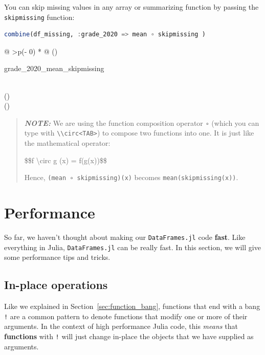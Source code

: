 \documentclass[
  notoc %
]{tufte-book}
\newcommand{\passthrough}[1]{#1}
\begin{document}
You can skip missing values in any array or summarizing function by
passing the \passthrough{\lstinline!skipmissing!} function:

\begin{lstlisting}[language=Julia]
combine(df_missing, :grade_2020 => mean ∘ skipmissing )
\end{lstlisting}

\begin{longtable}[]{@{}
  >{\raggedleft\arraybackslash}p{(\columnwidth - 0\tabcolsep) * }@{}}
\toprule()
\begin{minipage}[b]{\linewidth}\raggedleft
grade\_2020\_mean\_skipmissing
\end{minipage} \\
\midrule()
 \\
\bottomrule()
\end{longtable}

\begin{quote}
\textbf{\emph{NOTE:}} We are using the function composition operator
\passthrough{\lstinline!∘!} (which you can type with
\passthrough{\lstinline!\\circ<TAB>!}) to compose two functions into
one. It is just like the mathematical operator:

\$\$f \textbackslash circ g (x) = f(g(x))\$\$

Hence, \passthrough{\lstinline!(mean ∘ skipmissing)(x)!} becomes
\passthrough{\lstinline!mean(skipmissing(x))!}.
\end{quote}

\hypertarget{sec:df_performance}{%
\section{Performance}\label{sec:df_performance}}

So far, we haven't thought about making our
\passthrough{\lstinline!DataFrames.jl!} code \textbf{fast}. Like
everything in Julia, \passthrough{\lstinline!DataFrames.jl!} can be
really fast. In this section, we will give some performance tips and
tricks.

\hypertarget{sec:df_performance_inplace}{%
\subsection{In-place operations}\label{sec:df_performance_inplace}}

Like we explained in Section~\ref{sec:function_bang}, functions that end
with a bang \passthrough{\lstinline"!"} are a common pattern to denote
functions that modify one or more of their arguments. In the context of
high performance Julia code, this \emph{means} that \textbf{functions}
with \passthrough{\lstinline"!"} will just change in-place the objects
that we have supplied as arguments.
\end{document}
